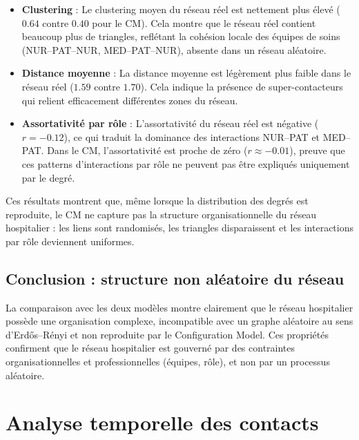 \documentclass[10pt,twocolumn]{article}
\begin{document}
\begin{itemize}
    \item \textbf{Clustering} : Le clustering moyen du réseau réel est nettement plus élevé ($0.64$ contre $0.40$ pour le CM). 
    Cela montre que le réseau réel contient beaucoup plus de triangles, reflétant la cohésion locale des équipes de soins (NUR–PAT–NUR, MED–PAT–NUR), absente dans un réseau aléatoire.
    
    \item \textbf{Distance moyenne} : La distance moyenne est légèrement plus faible dans le réseau réel ($1.59$ contre $1.70$). 
    Cela indique la présence de super-contacteurs qui relient efficacement différentes zones du réseau.
    
    \item \textbf{Assortativité par rôle} : L'assortativité du réseau réel est négative ($r = -0.12$), ce qui traduit la dominance des interactions NUR--PAT et MED--PAT. 
    Dans le CM, l'assortativité est proche de zéro ($r \approx -0.01$), preuve que ces patterns d'interactions par rôle ne peuvent pas être expliqués uniquement par le degré.
\end{itemize}

Ces résultats montrent que, même lorsque la distribution des degrés est reproduite, le CM ne capture pas la structure organisationnelle du réseau hospitalier : les liens sont randomisés, les triangles disparaissent et les interactions par rôle deviennent uniformes.

\subsection{Conclusion : structure non aléatoire du réseau}

La comparaison avec les deux modèles montre clairement que le réseau hospitalier possède une organisation complexe, incompatible avec un graphe aléatoire au sens d'Erdős–Rényi et non reproduite par le Configuration Model. 
Ces propriétés confirment que le réseau hospitalier est gouverné par des contraintes organisationnelles et professionnelles (équipes, rôle), et non par un processus aléatoire. 

\section{Analyse temporelle des contacts}
\end{document}
